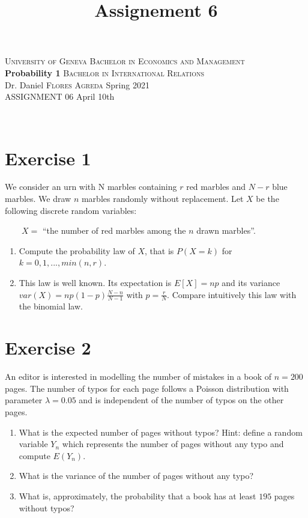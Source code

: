\documentclass[12pt,thmsa]{article}\usepackage[]{graphicx}\usepackage[]{color}
\title{Assignement 6}
\begin{document}
\noindent \textsc{University of Geneva}     \hfill \textsc{Bachelor in Economics and Management} \\
\textbf{Probability 1}                      \hfill \textsc{Bachelor in International Relations} \\
Dr. Daniel \textsc{Flores Agreda}                 \hfill Spring 2021  \\
ASSIGNMENT 06                               \hfill   April 10th



\noindent
\makebox[\linewidth]{\rule{\textwidth}{0.4pt}}\\[1.5ex]


\section*{Exercise 1}

We consider an urn with N marbles containing $r$ red marbles and $N-r$ blue marbles. We draw $n$ marbles randomly without replacement.
Let $X$ be the following discrete random variables:

$ \qquad X=$ ``the number of red marbles among the $n$ drawn marbles''.

\begin{enumerate}
  \item Compute the probability law of $X$, that is $P(X=k)$ for $k=0,1,...,min(n,r)$.
  \item This law is well known. Its expectation is $E[X]=np$ and its variance $var(X)=np(1-p)\frac{N-n}{N-1}$ with $p=\frac{r}{N}$.
  Compare intuitively this law with the binomial law.
\end{enumerate}


\section*{Exercise 2}

An editor is interested in modelling the number of mistakes in a book of $n=200$ pages. The number of typos for each page follows a Poisson distribution
with parameter $\lambda=0.05$ and is independent of the number of typos on the other pages.
\begin{enumerate}
  \item What is the expected number of pages without typos? \newline
  Hint: define a random variable $Y_n$ which represents the number of pages without any typo and compute $E(Y_n)$.
  \item What is the variance of the number of pages without any typo?
  \item What is, approximately, the probability that a book has at least $195$ pages without typos? %
\end{enumerate}
\end{document}
